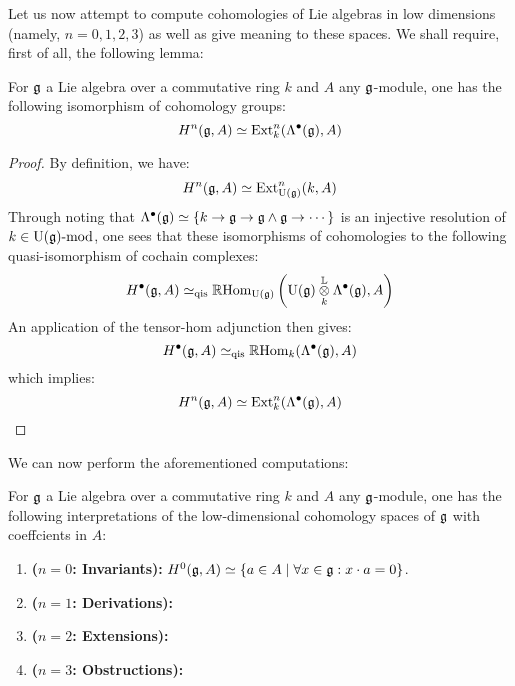                     Let us now attempt to compute cohomologies of Lie algebras in low dimensions (namely, $n = 0, 1, 2, 3$) as well as give meaning to these spaces. We shall require, first of all, the following lemma:
                    \begin{lemma} \label{lemma: de_rham_resolutions_of_lie_algebras}
                        For $\mathfrak{g}$ a Lie algebra over a commutative ring $k$ and $A$ any $\mathfrak{g}$-module, one has the following isomorphism of cohomology groups:
                            $$H^n(\mathfrak{g}, A) \simeq \mathrm{Ext}^n_k(\Lambda^{\bullet}(\mathfrak{g}), A)$$
                    \end{lemma}
                        \begin{proof}
                            By definition, we have:
                                $$H^n(\mathfrak{g}, A) \simeq \mathrm{Ext}^n_{\mathrm{U}(\mathfrak{g})}(k, A)$$
                            Through noting that $\Lambda^{\bullet}(\mathfrak{g}) \simeq \{k \to \mathfrak{g} \to \mathfrak{g} \wedge \mathfrak{g} \to \cdots\}$ is an injective resolution of $k \in \mathrm{U}(\mathfrak{g})\text{-}\mathrm{mod}$, one sees that these isomorphisms of cohomologies  to the following quasi-isomorphism of cochain complexes:
                                $$H^{\bullet}(\g, A) \cong_{\qis} \R\Hom_{\U(\g)}\left(\U(\g) \tensor_k^{\L} \Lambda^{\bullet}(\g), A\right)$$
                            An application of the tensor-hom adjunction then gives:
                                $$H^{\bullet}(\mathfrak{g}, A) \simeq_{\mathrm{qis}} \mathbb{R}\mathrm{Hom}_k(\Lambda^{\bullet}(\mathfrak{g}), A)$$
                            which implies:
                                $$H^n(\mathfrak{g}, A) \simeq \mathrm{Ext}^n_k(\Lambda^{\bullet}(\mathfrak{g}), A)$$
                        \end{proof}
                    We can now perform the aforementioned computations:
                    \begin{proposition}
                        For $\mathfrak{g}$ a Lie algebra over a commutative ring $k$ and $A$ any $\mathfrak{g}$-module, one has the following interpretations of the low-dimensional cohomology spaces of $\mathfrak{g}$ with coeffcients in $A$:
                        \begin{enumerate}
                            \item \textbf{($n = 0$: Invariants):} $H^0(\mathfrak{g}, A) \simeq \{a \in A \mid \forall x \in \mathfrak{g}: x \cdot a = 0\}$.
                            \item \textbf{($n = 1$: Derivations):}
                            \item \textbf{($n = 2$: Extensions):}
                            \item \textbf{($n = 3$: Obstructions):}
                        \end{enumerate}
                    \end{proposition}
